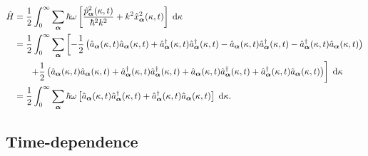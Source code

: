 \documentclass{article}
\numberwithin{equation}{section}
\begin{document}
\begin{equation}
\begin{split}
\hat{H} &= \frac{1}{2}\int_0^\infty\sum_{\bm{\alpha}}\hbar\omega\left[\frac{\hat{p}_{\bm{\alpha}}^2(\kappa,t)}{\hbar^2k^2} + k^2\hat{x}_{\bm{\alpha}}^2(\kappa,t)\right]\;\mathrm{d}\kappa\\
&= \frac{1}{2}\int_0^\infty\sum_{\bm{\alpha}}\left[-\frac{1}{2}\left(\hat{a}_{\bm{\alpha}}(\kappa,t)\hat{a}_{\bm{\alpha}}(\kappa,t) + \hat{a}_{\bm{\alpha}}^\dagger(\kappa,t)\hat{a}_{\bm{\alpha}}^\dagger(\kappa,t) - \hat{a}_{\bm{\alpha}}(\kappa,t)\hat{a}_{\bm{\alpha}}^\dagger(\kappa,t) - \hat{a}_{\bm{\alpha}}^\dagger(\kappa,t)\hat{a}_{\bm{\alpha}}(\kappa,t)\right)\right.\\
&\left.\hspace{0.05\textwidth}+\frac{1}{2}\left(\hat{a}_{\bm{\alpha}}(\kappa,t)\hat{a}_{\bm{\alpha}}(\kappa,t) + \hat{a}_{\bm{\alpha}}^\dagger(\kappa,t)\hat{a}_{\bm{\alpha}}^\dagger(\kappa,t) + \hat{a}_{\bm{\alpha}}(\kappa,t)\hat{a}_{\bm{\alpha}}^\dagger(\kappa,t) + \hat{a}_{\bm{\alpha}}^\dagger(\kappa,t)\hat{a}_{\bm{\alpha}}(\kappa,t)\right)\right]\;\mathrm{d}\kappa\\
&= \frac{1}{2}\int_0^\infty\sum_{\bm{\alpha}}\hbar\omega\left[\hat{a}_{\bm{\alpha}}(\kappa,t)\hat{a}_{\bm{\alpha}}^\dagger(\kappa,t) + \hat{a}_{\bm{\alpha}}^\dagger(\kappa,t)\hat{a}_{\bm{\alpha}}(\kappa,t)\right]\;\mathrm{d}\kappa.
\end{split}
\end{equation}














\subsection{Time-dependence}
\end{document}
